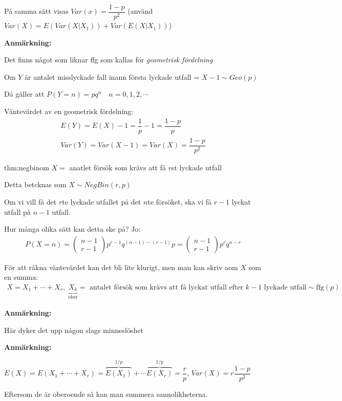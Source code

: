 \par\bigskip
\noindent På samma sätt visas $Var(x) = \dfrac{1-p}{p^2}$ (använd $Var(X) = E(Var(X|X_1)) + Var(E(X|X_1))$)
\par\bigskip
\noindent\textbf{Anmärkning:}\par
\noindent Det finns något som liknar ffg som kallas för \textit{geometrisk fördelning}
\par\bigskip
\noindent Om $Y$ är antalet misslyckade fall inann första lyckade utfall = $X-1\sim Geo(p)$ \par
\noindent Då gäller att $P(Y=n) = pq^n\quad n=0,1,2,\cdots$
\par\bigskip
\noindent Väntevärdet av en geometrisk fördelning:
\begin{equation*}
  \begin{gathered}
    E(Y) = E(X) -1 = \dfrac{1}{p}-1 = \dfrac{1-p}{p}\\
    Var(Y) = Var(X-1) = Var(X) = \dfrac{1-p}{p^2}
  \end{gathered}
\end{equation*}
\newpage
\begin{theo}{thm:negbinom}
  $X=$ anatlet försök som krävs att få $r$st lyckade utfall\par
  \noindent Detta betcknas som $X\sim NegBin(r,p)$
\end{theo}\par
\noindent Om vi vill få det $r$te lyckade utfallet på det $n$te försöket, ska vi få $r-1$ lyckat utfall på $n-1$ utfall.\par
\noindent Hur många olika sätt kan detta ske på? Jo:
\begin{equation*}
  \begin{gathered}
    P(X=n) = \begin{pmatrix}n-1\\r-1\end{pmatrix}p^{r-1}q^{(n-1)-(r-1)}p = \begin{pmatrix}n-1\\r-1\end{pmatrix}p^rq^{n-r}
  \end{gathered}
\end{equation*}
\par\bigskip
\noindent För att räkna väntevärdet kan det bli lite klurigt, men man kan skriv aom $X$ som en summa:
\begin{equation*}
  \begin{gathered}
    X = X_1+\cdots+X_r,\;\underbrace{X_k}_{\text{ober}} = \text{ antalet försök som krävs att få lyckat utfall efter $k-1$ lyckade utfall}\sim\text{ffg}(p)
  \end{gathered}
\end{equation*}\par
\noindent\textbf{Anmärkning:}\par
\noindent Här dyker det upp någon slags minneslöshet
\par\bigskip
\noindent\textbf{Anmärkning:}\par
\noindent $E(X) = E(X_1+\cdots+X_r) = \overbrace{E(X_1)}^{\text{$1/p$}}+\cdots \overbrace{E(X_r)}^{\text{$1/p$}} = \dfrac{r}{p}$, $Var(X) = r\dfrac{1-p}{p^2}$\par
\noindent Eftersom de är oberoende så kan man summera sannolikheterna. 
